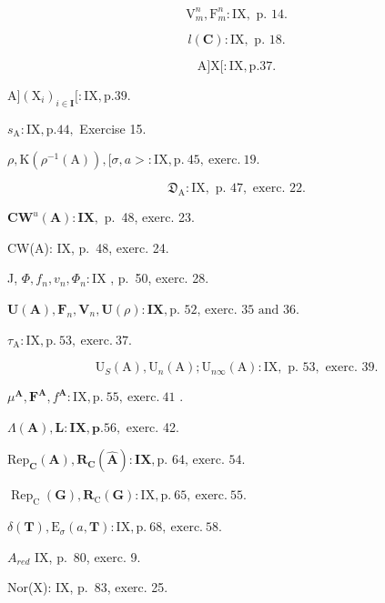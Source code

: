 \[
\mathrm{V} _ {m} ^ {n}, \mathrm{F} _ {m} ^ {n}: \mathrm{IX}, \text { p. } 14.
\]

\[
l (\mathbf {C}): \mathrm{IX}, \text { p. } 18.
\]

\[
\mathrm{A} ] \mathrm{X} [: \mathrm{IX}, \mathrm{p}. 37.
\]

\(\mathrm{A}]\left(\mathrm{X}_{i}\right)_{i\in \mathbf{I}}[: \mathrm{IX},\mathrm{p.}39.\)

\(s_{\mathrm{A}}:\mathrm{IX},\mathrm{p.}44,\) Exercise 15.

\(\rho,\mathrm{K}(\rho^{-1}(\mathrm{A})),[\sigma,a>:\mathrm{IX},\mathrm{p.~45,~exerc.~19}.\)

\[
\mathfrak {D} _ {\mathrm{A}}: \mathrm{IX}, \text { p. } 47, \text { exerc. } 22.
\]

\(\mathbf{CW}^u (\mathbf{A}):\mathbf{IX},\) p.~48, exerc. 23.

CW(A): IX, p.~48, exerc. 24.

J, \(\Phi, f_n, v_n, \Phi_n: \mathrm{IX}\) , p.~50, exerc. 28.

\(\mathbf{U}(\mathbf{A}), \mathbf{F}_n, \mathbf{V}_n, \mathbf{U}(\rho) : \mathbf{IX}, \text{p. 52, exerc. 35 and 36.}\)

\(\tau_{\mathrm{A}}:\mathrm{IX},\mathrm{p.~53,~exerc.~37.}\)

\[
\mathrm{U} _ {S} (\mathrm{A}), \mathrm{U} _ {n} (\mathrm{A}); \mathrm{U} _ {n \infty} (\mathrm{A}): \mathrm{IX}, \text { p. } 53, \text { exerc. } 39.
\]

\(\mu^{\mathbf{A}}, \mathbf{F}^{\mathbf{A}}, f^{\mathbf{A}}: \mathrm{IX}, \mathrm{p.~55,~exerc.~41}\) .

\(\Lambda (\mathbf{A}),\mathbf{L}:\mathbf{IX},\mathbf{p}.56,\) exerc. 42.

\(\mathrm{Rep}_{\mathbf{C}}(\mathbf{A}), \mathbf{R}_{\mathbf{C}}(\mathbf{\hat{A}}) : \mathbf{IX}, \text{p. 64, exerc. 54.}\)

\(\operatorname{Rep}_{\mathrm{C}}(\mathbf{G}), \mathbf{R}_{\mathrm{C}}(\mathbf{G}) : \mathrm{IX}, \mathrm{p.~65,~exerc.~55}.\)

\(\delta (\mathbf{T}),\mathrm{E}_{\sigma}(a,\mathbf{T}):\mathrm{IX},\mathrm{p.~68,~exerc.~58.}\)

\(A_{red}\) IX, p.~80, exerc. 9.

Nor(X): IX, p.~83, exerc. 25.

